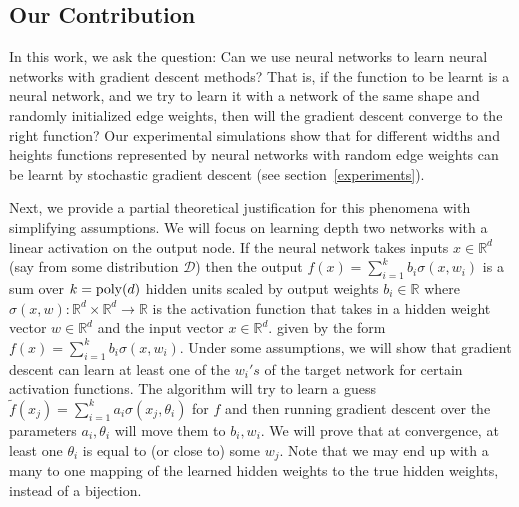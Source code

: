 \documentclass{article}
\newcommand{\R}{{\mathbb{R}}}
\begin{document}
\subsection{Our Contribution}


In this work, we ask the question: Can we use neural networks to learn neural networks with gradient descent methods? That is, if the function to be learnt is a neural network, and we try to learn it with a network of the same shape and randomly initialized edge weights, then will the gradient descent converge to the right function? Our experimental simulations show that for different widths and heights functions represented by neural networks with random edge weights can be learnt by stochastic gradient descent (see section~\ref{experiments}).

Next, we provide a partial theoretical justification for this phenomena with simplifying assumptions. We will focus on learning depth two networks with a linear activation on the output node. If the neural network takes inputs  $x \in \R^d$ (say from some distribution $\mathcal{D}$) then the output $f(x) = \sum_{i=1}^k b_i\sigma(x,w_i)$ is a sum over $k = \mathrm{poly}(d)$ hidden units scaled by output weights $b_i \in \R$ where $\sigma(x,w):\R^d \times \R^d\to \R$ is the activation function that takes in a hidden weight vector $w \in \R^d$ and the input vector $x \in \R^d$.
given by the form $f(x) = \sum_{i=1}^k b_i\sigma(x,w_i)$. Under some assumptions, we will show that gradient descent can learn at least one of the  $w_i's$ of the target network for certain activation functions. The algorithm will try to learn a guess $\widetilde{f}(x_j) = \sum_{i=1}^k a_i \sigma(x_j,\theta_i)$ for $f$ and then running gradient descent over the parameters $a_i, \theta_i$ will move them to $b_i, w_i$. We will prove that at convergence, at least one $\theta_i$ is equal to (or close to) some $w_j$. Note that we may end up with a many to one mapping of the learned hidden weights to the true hidden weights, instead of a bijection.
\end{document}
